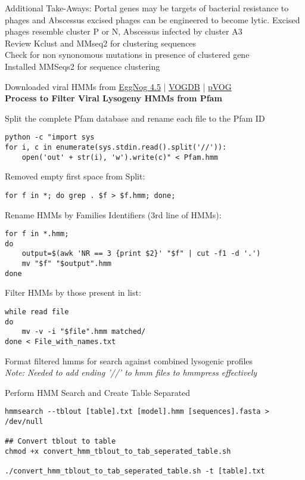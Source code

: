 \documentclass[idxtotoc,hyperref,openany,oneside]{labbook} %
\begin{document}
Additional Take-Aways: Portal genes may be targets of bacterial resistance to phages and Abscessus excised phages can be engineered to become lytic.  Excised phages resemble cluster P or N, Abscessus infected by cluster A3\\

Review Kclust and MMseq2 for clustering sequences \\

Check for non synonomous mutations in presence of clustered gene \\

Installed MMSeqs2 for sequence clustering

Downloaded viral HMMs from \href{http://eggnogdb.embl.de/#/app/viruses}{EggNog 4.5}  |  \href{http://vogdb.org/download}{VOGDB}  | \href{http://dmk-brain.ecn.uiowa.edu/pVOGs/downloads.html}{pVOG} \\

\textbf{Process to Filter Viral Lysogeny HMMs from Pfam}

Split the complete Pfam database and rename each file to the Pfam ID 

\begin{verbatim}
python -c "import sys
for i, c in enumerate(sys.stdin.read().split('//')):
    open('out' + str(i), 'w').write(c)" < Pfam.hmm
\end{verbatim}

Removed empty first space from Split:
\begin{verbatim}
for f in *; do grep . $f > $f.hmm; done;
\end{verbatim}

Rename HMMs by Families Identifiers (3rd line of HMMs):
\begin{verbatim}
for f in *.hmm; 
do 
	output=$(awk 'NR == 3 {print $2}' "$f" | cut -f1 -d '.')
	mv "$f" "$output".hmm
done
\end{verbatim}

Filter HMMs by those present in list:
\begin{verbatim}
while read file
do
	mv -v -i "$file".hmm matched/
done < File_with_names.txt
\end{verbatim}

Format filtered hmms for search against combined lysogenic profiles \\
\textit{Note: Needed to add ending '//' to hmm files to hmmpress effectively}

Perform HMM Search and Create Table Separated
\begin{verbatim}
hmmsearch --tblout [table].txt [model].hmm [sequences].fasta > /dev/null

## Convert tblout to table
chmod +x convert_hmm_tblout_to_tab_seperated_table.sh

./convert_hmm_tblout_to_tab_seperated_table.sh -t [table].txt 
\end{verbatim}
\end{document}
